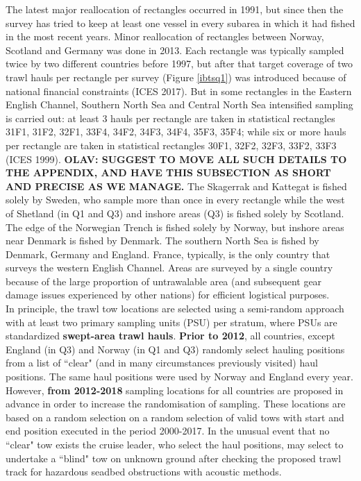 \documentclass[a4paper 12pt]{article}
\numberwithin{equation}{section}
\begin{document}
\indent The latest major reallocation of rectangles occurred in 1991, but since then the survey has tried to keep at least one vessel in every subarea in which it had fished in the most recent years. Minor reallocation of rectangles between Norway, Scotland and Germany was done in 2013. Each rectangle was  typically sampled twice by two different countries before 1997, but after that target coverage of two trawl hauls per rectangle per survey (Figure \ref{ibtsq1}) was introduced because of national financial constraints (ICES 2017). But in some rectangles in the Eastern English Channel, Southern North Sea and Central North Sea intensified sampling is carried out: at least 3 hauls per rectangle are taken in statistical rectangles  31F1, 31F2, 32F1, 33F4, 34F2, 34F3, 34F4, 35F3, 35F4; while six or more hauls per rectangle are taken in statistical rectangles  30F1, 32F2, 32F3, 33F2, 33F3 (ICES 1999). {\bf OLAV: SUGGEST TO MOVE ALL SUCH DETAILS TO THE APPENDIX, AND HAVE THIS SUBSECTION AS SHORT AND PRECISE AS WE MANAGE.} The Skagerrak and Kattegat is fished solely by Sweden, who sample more than once in every rectangle while the west of Shetland (in Q1 and Q3) and inshore areas (Q3) is fished solely by Scotland. The edge of the Norwegian Trench is fished solely by Norway, but inshore areas near Denmark is fished by Denmark. The southern North Sea is fished by Denmark, Germany and England. France, typically, is the only country that surveys the western English Channel. Areas are surveyed by a single country because of the large proportion of untrawalable area (and subsequent gear damage issues experienced by other nations)  for efficient logistical purposes.\\
\indent In principle, the trawl tow locations are selected using a  semi-random approach with at least two primary sampling units (PSU) per stratum, where PSUs are standardized {\bf swept-area trawl hauls}. {\bf Prior to 2012}, all countries, except England (in Q3) and Norway (in Q1 and Q3) randomly select hauling positions from a list of ``clear" (and in many circumstances previously visited) haul positions. The same haul positions were used by Norway and England every year. However, {\bf from 2012-2018} sampling locations for all countries are proposed in advance in order to increase the randomisation of sampling. These locations are based on a random selection on a random selection of valid tows with start and end position executed in the period 2000-2017. In the unusual event that no ``clear" tow exists the cruise leader, who select the haul positions, may select to undertake a ``blind" tow on unknown ground after checking the proposed trawl track for hazardous seadbed obstructions with acoustic methods. \\
\end{document}
